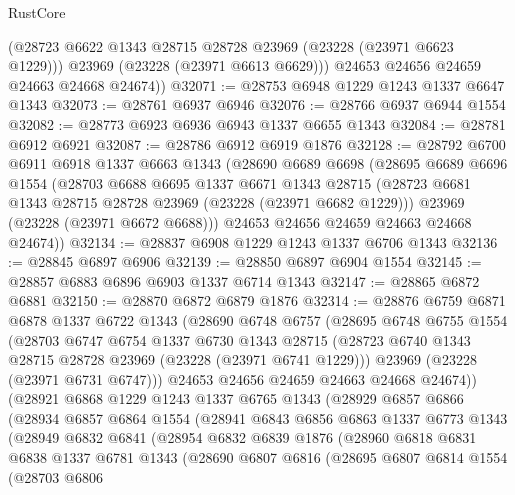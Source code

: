 \begin{lexlean}{RustCore}
\begin{coremodule}
          (@28723 @6622 @1343 @28715 @28728 @23969 (@23228 (@23971 @6623 @1229)))
          @23969
          (@23228 (@23971 @6613 @6629)))
        @24653
        @24656
        @24659
        @24663
        @24668
        @24674))
@32071 := @28753 @6948 @1229 @1243 @1337 @6647 @1343
@32073 := @28761 @6937 @6946
@32076 := @28766 @6937 @6944 @1554
@32082 := @28773 @6923 @6936 @6943 @1337 @6655 @1343
@32084 := @28781 @6912 @6921
@32087 := @28786 @6912 @6919 @1876
@32128 := @28792
    @6700
    @6911
    @6918
    @1337
    @6663
    @1343
    (@28690
      @6689
      @6698
      (@28695
        @6689
        @6696
        @1554
        (@28703
          @6688
          @6695
          @1337
          @6671
          @1343
          @28715
          (@28723 @6681 @1343 @28715 @28728 @23969 (@23228 (@23971 @6682 @1229)))
          @23969
          (@23228 (@23971 @6672 @6688)))
        @24653
        @24656
        @24659
        @24663
        @24668
        @24674))
@32134 := @28837 @6908 @1229 @1243 @1337 @6706 @1343
@32136 := @28845 @6897 @6906
@32139 := @28850 @6897 @6904 @1554
@32145 := @28857 @6883 @6896 @6903 @1337 @6714 @1343
@32147 := @28865 @6872 @6881
@32150 := @28870 @6872 @6879 @1876
@32314 := @28876
    @6759
    @6871
    @6878
    @1337
    @6722
    @1343
    (@28690
      @6748
      @6757
      (@28695
        @6748
        @6755
        @1554
        (@28703
          @6747
          @6754
          @1337
          @6730
          @1343
          @28715
          (@28723 @6740 @1343 @28715 @28728 @23969 (@23228 (@23971 @6741 @1229)))
          @23969
          (@23228 (@23971 @6731 @6747)))
        @24653
        @24656
        @24659
        @24663
        @24668
        @24674))
    (@28921
      @6868
      @1229
      @1243
      @1337
      @6765
      @1343
      (@28929
        @6857
        @6866
        (@28934
          @6857
          @6864
          @1554
          (@28941
            @6843
            @6856
            @6863
            @1337
            @6773
            @1343
            (@28949
              @6832
              @6841
              (@28954
                @6832
                @6839
                @1876
                (@28960
                  @6818
                  @6831
                  @6838
                  @1337
                  @6781
                  @1343
                  (@28690
                    @6807
                    @6816
                    (@28695
                      @6807
                      @6814
                      @1554
                      (@28703
                        @6806

\end{coremodule}
\end{lexlean}
